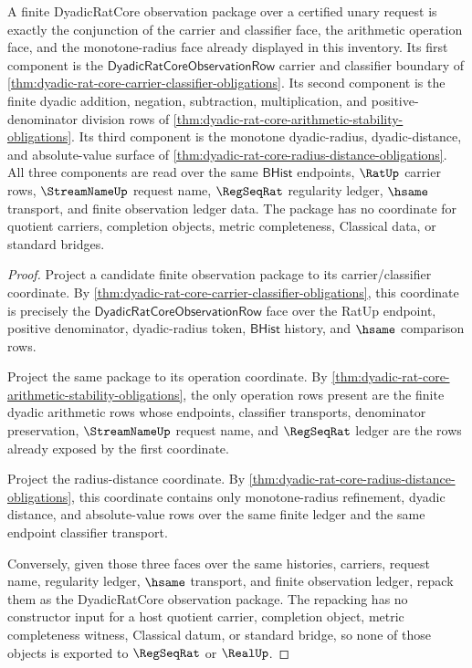 \begin{theorem}
\label{thm:dyadic-rat-core-finite-observation-obligation-package}
A finite DyadicRatCore observation package over a certified unary request is
exactly the conjunction of the carrier and classifier face, the arithmetic
operation face, and the monotone-radius face already displayed in this
inventory. Its first component is the
$\mathsf{DyadicRatCoreObservationRow}$ carrier and classifier boundary of
\autoref{thm:dyadic-rat-core-carrier-classifier-obligations}. Its second
component is the finite dyadic addition, negation, subtraction,
multiplication, and positive-denominator division rows of
\autoref{thm:dyadic-rat-core-arithmetic-stability-obligations}. Its third
component is the monotone dyadic-radius, dyadic-distance, and absolute-value
surface of \autoref{thm:dyadic-rat-core-radius-distance-obligations}. All
three components are read over the same $\mathsf{BHist}$ endpoints, $\RatUp$
carrier rows, $\StreamNameUp$ request name, $\RegSeqRat$ regularity ledger,
$\hsame$ transport, and finite observation ledger data. The package has no
coordinate for quotient carriers, completion objects, metric completeness,
Classical data, or standard bridges.
\end{theorem}
\begin{proof}
Project a candidate finite observation package to its carrier/classifier
coordinate. By
\autoref{thm:dyadic-rat-core-carrier-classifier-obligations}, this coordinate
is precisely the $\mathsf{DyadicRatCoreObservationRow}$ face over the RatUp
endpoint, positive denominator, dyadic-radius token, $\mathsf{BHist}$ history,
and $\hsame$ comparison rows.

Project the same package to its operation coordinate. By
\autoref{thm:dyadic-rat-core-arithmetic-stability-obligations}, the only
operation rows present are the finite dyadic arithmetic rows whose endpoints,
classifier transports, denominator preservation, $\StreamNameUp$ request name,
and $\RegSeqRat$ ledger are the rows already exposed by the first coordinate.

Project the radius-distance coordinate. By
\autoref{thm:dyadic-rat-core-radius-distance-obligations}, this coordinate
contains only monotone-radius refinement, dyadic distance, and absolute-value
rows over the same finite ledger and the same endpoint classifier transport.

Conversely, given those three faces over the same histories, carriers, request
name, regularity ledger, $\hsame$ transport, and finite observation ledger,
repack them as the DyadicRatCore observation package. The repacking has no
constructor input for a host quotient carrier, completion object, metric
completeness witness, Classical datum, or standard bridge, so none of those
objects is exported to $\RegSeqRat$ or $\RealUp$.
\end{proof}
